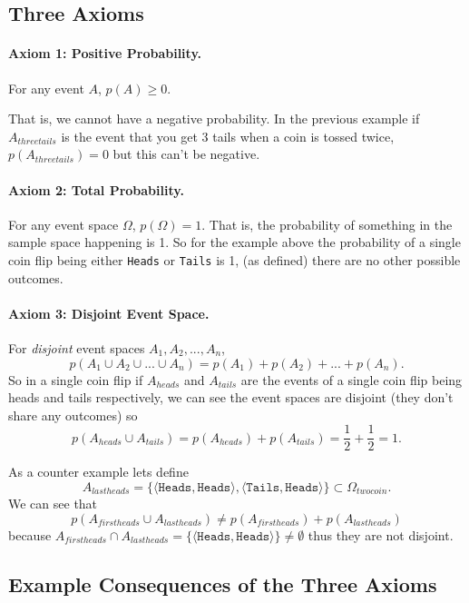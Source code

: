 \subsection{Three Axioms}

\paragraph{Axiom 1: Positive Probability.}
For any event $A$, $p(A)\ge 0$.

That is, we cannot have a negative probability. 
In the previous example if $A_{threetails}$ is the event that you get 3 tails when a coin is tossed twice, 
$p(A_{threetails})=0$ but this can't be negative.

\paragraph{Axiom 2: Total Probability.}
For any event space $\Omega$, $p(\Omega)=1$. 
That is, the probability of something in the sample space happening is 1. 
So for the example above the probability of a single coin flip being either \texttt{Heads} or \texttt{Tails} is 1, 
(as defined) there are no other possible outcomes. 

\paragraph{Axiom 3: Disjoint Event Space.}
For \textit{disjoint} event spaces $A_1, A_2, ..., A_n$, \[p(A_1\cup A_2\cup ... \cup A_n)=p(A_1) + p(A_2) + ... + p(A_n).\]
So in a single coin flip if $A_{heads}$ and $A_{tails}$ are the events of a single coin flip being heads and tails respectively, 
we can see the event spaces are disjoint (they don't share any outcomes)
so \[p(A_{heads} \cup A_{tails}) = p(A_{heads}) + p(A_{tails}) = \frac{1}{2} + \frac{1}{2} = 1.\]

As a counter example lets define \[A_{lastheads}=\{
\langle\texttt{Heads},\texttt{Heads}\rangle,
\langle\texttt{Tails},\texttt{Heads}\rangle\} \subset \Omega_{twocoin}. \]
We can see that 
\[p(A_{firstheads} \cup A_{lastheads}) \ne p(A_{firstheads}) + p(A_{lastheads})\]
because $A_{firstheads} \cap A_{lastheads} = \{\langle\texttt{Heads},\texttt{Heads}\rangle\} \ne \emptyset$ thus they are not disjoint.


\subsection{Example Consequences of the Three Axioms}

